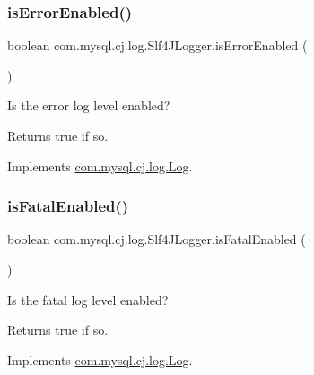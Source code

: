 \subsubsection{\texorpdfstring{is\+Error\+Enabled()}{isErrorEnabled()}}
{\footnotesize\ttfamily boolean com.\+mysql.\+cj.\+log.\+Slf4\+J\+Logger.\+is\+Error\+Enabled (\begin{DoxyParamCaption}{ }\end{DoxyParamCaption})}

Is the \textquotesingle{}error\textquotesingle{} log level enabled?

\begin{DoxyReturn}{Returns}
true if so. 
\end{DoxyReturn}


Implements \mbox{\hyperlink{interfacecom_1_1mysql_1_1cj_1_1log_1_1_log_abda4b698026fdb26c74b211b521628c9}{com.\+mysql.\+cj.\+log.\+Log}}.

\mbox{\label{classcom_1_1mysql_1_1cj_1_1log_1_1_slf4_j_logger_ae5ee0af225f5bc993dc023b8b31de983}} 
\subsubsection{\texorpdfstring{is\+Fatal\+Enabled()}{isFatalEnabled()}}
{\footnotesize\ttfamily boolean com.\+mysql.\+cj.\+log.\+Slf4\+J\+Logger.\+is\+Fatal\+Enabled (\begin{DoxyParamCaption}{ }\end{DoxyParamCaption})}

Is the \textquotesingle{}fatal\textquotesingle{} log level enabled?

\begin{DoxyReturn}{Returns}
true if so. 
\end{DoxyReturn}


Implements \mbox{\hyperlink{interfacecom_1_1mysql_1_1cj_1_1log_1_1_log_a61464d2603e609442da19c59c5c62f62}{com.\+mysql.\+cj.\+log.\+Log}}.

\mbox{\label{classcom_1_1mysql_1_1cj_1_1log_1_1_slf4_j_logger_ab21b243a10ab8a46a4706658298ecd5e}} 
